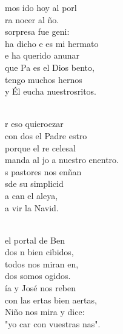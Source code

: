 \documentclass[12pt]{article}
\begin{document}
\begin{multicols*}{2}
\begin{cancion}%
	mos ido hoy al porl\\
	ra nocer al ño.\\
	 sorpresa fue geni:\\
	 ha dicho e es mi hermato\\
	e ha querido anunar\\
	que Pa es el Dios bento, \\
	 tengo muchos hernos\\
	y Él eucha nuestrosritos.\\\jump\\
	\begin{chorus}%
	r eso quieroezar\\
	con dos el Padre estro\\
	porque el re celesal\\
	manda al jo a nuestro enentro.\\
	s pastores nos enñan\\
	sde su simplicid\\
	a can el aleya,\\
	a vir la Navid.\\
	\end{chorus}%
	\jump\\
	 el portal de Ben \\
	dos n bien cibidos,\\
	todos nos miran en,\\
	dos somos ogidos.  \\
	ía y José nos reben\\
	con las ertas bien aertas,\\
	Niño nos mira y dice:\\
	"yo car con vuestras nas".\\\jump\\

\end{cancion}
\end{multicols*}
\end{document}
